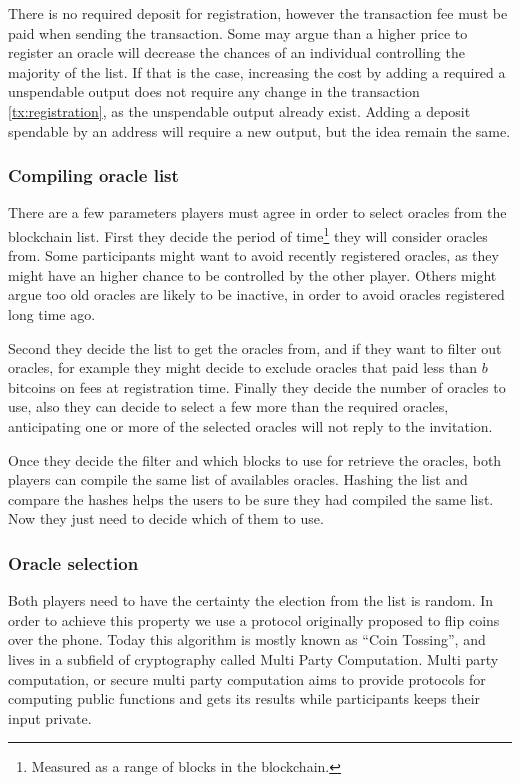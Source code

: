 There is no required deposit for registration, however the transaction fee must
  be paid when sending the transaction.
Some may argue than a higher price to register an oracle will decrease the
  chances of an individual controlling the majority of the list.
If that is the case, increasing the cost by adding a required a unspendable
output does not require any change in the transaction \ref{tx:registration},
  as the unspendable output already exist.
Adding a deposit spendable by an address will require a new output, but the
  idea remain the same.

\subsubsection{Compiling oracle list}

There are a few parameters players must agree in order to select oracles from
  the blockchain list.
First they decide the period of time\footnote{Measured as a range of blocks in
  the blockchain.} they will consider oracles from.
Some participants might want to avoid recently registered oracles, as they might
  have an higher chance to be controlled by the other player.
Others might argue too old oracles are likely to be inactive, in order to avoid
  oracles registered long time ago.

Second they decide the list to get the oracles from, and if they want to filter
  out oracles, for example they might decide to exclude oracles that paid less
  than $b$ bitcoins on fees at registration time.
Finally they decide the number of oracles to use, also they can decide to
  select a few more than the required oracles, anticipating one or more of
  the selected oracles will not reply to the invitation.

Once they decide the filter and which blocks to use for retrieve the oracles,
  both players can compile the same list of availables oracles.
Hashing the list and compare the hashes helps the users to be sure they had
  compiled the same list.
Now they just need to decide which of them to use.

\subsubsection{Oracle selection}

Both players need to have the certainty the election from the list is random.
In order to achieve this property we use a protocol originally proposed to flip
  coins over the phone\cite{blum1983coin}.
Today this algorithm is mostly known as ``Coin Tossing'', and lives in a
  subfield of cryptography called Multi Party Computation.
Multi party computation, or secure multi party computation aims to provide
  protocols for computing public functions and gets its results while
  participants keeps their input private.

